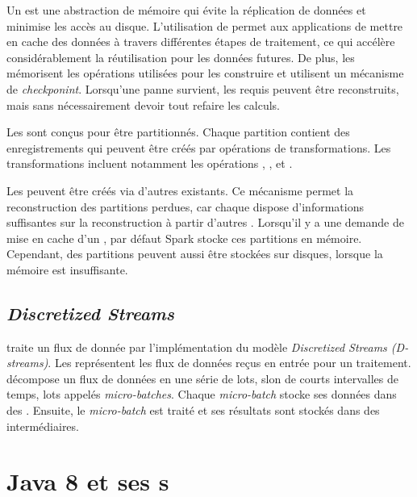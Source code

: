 Un  est une abstraction de m\'emoire qui \'evite la r\'eplication de donn\'ees et minimise les acc\`es au disque. L'utilisation de   permet aux applications de mettre en cache des donn\'ees \`a travers diff\'erentes \'etapes de traitement, ce qui acc\'el\`ere consid\'erablement la r\'eutilisation pour les donn\'ees futures. De plus, les  m\'emorisent les op\'erations utilis\'ees pour les construire et utilisent un m\'ecanisme de \emph{checkponint}. Lorsqu'une panne survient, les  requis peuvent \^etre reconstruits, mais sans n\'ecessairement devoir tout refaire les calculs.

Les  sont conçus pour \^etre partitionn\'es. Chaque partition contient des enregistrements qui peuvent \^etre cr\'e\'es par op\'erations de transformations. Les transformations incluent notamment les opérations , ,  et .

Les  peuvent \^etre cr\'e\'es via d'autres  existants. Ce m\'ecanisme permet la reconstruction des partitions perdues, car chaque  dispose d'informations suffisantes sur la reconstruction \`a partir d'autres . Lorsqu'il y a une demande de mise en cache d'un , par d\'efaut Spark stocke ces partitions en m\'emoire. Cependant, des partitions peuvent aussi \^etre stock\'ees sur disques, lorsque la m\'emoire est insuffisante.


\subsection*{\emph{Discretized Streams}}

 traite un flux de donn\'ee par l'implémentation du mod\`ele \emph{Discretized Streams (D-streams)}.  Les  repr\'esentent les flux de donn\'ees re\c{c}us en entr\'ee pour un traitement.  d\'ecompose un flux de donn\'ees en une s\'erie de lots, slon de courts intervalles de temps, lots appel\'es \emph{micro-batches}. Chaque \emph{micro-batch} stocke ses donn\'ees dans des . Ensuite, le \emph{micro-batch} est trait\'e et ses r\'esultats sont stock\'es dans des  interm\'ediaires.


\section{Java 8 et ses s}

